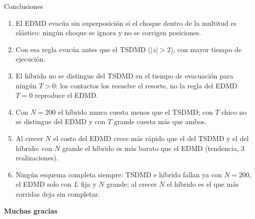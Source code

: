 \begin{frame}{Conclusiones}
  \begin{enumerate}
    \small
    \item El EDMD evacúa sin superposición si el choque dentro de la multitud es elástico: ningún choque se ignora y no se corrigen posiciones.
    \item Con esa regla evacúa antes que el TSDMD ($|z|>2$), con mayor tiempo de ejecución.
    \item El híbrido no se distingue del TSDMD en el tiempo de evacuación para ningún $T>0$: los contactos los resuelve el resorte, no la regla del EDMD. $T = 0$ reproduce el EDMD.
    \item Con $N = 200$ el híbrido nunca cuesta menos que el TSDMD; con $T$ chico no se distingue del EDMD y con $T$ grande cuesta más que ambos.
    \item Al crecer $N$ el costo del EDMD crece más rápido que el del TSDMD y el del híbrido: con $N$ grande el híbrido es más barato que el EDMD (tendencia, 3 realizaciones).
    \item Ningún esquema completa siempre: TSDMD e híbrido fallan ya con $N = 200$, el EDMD solo con $L$ fija y $N$ grande; al crecer $N$ el híbrido es el que más corridas deja sin completar.
  \end{enumerate}
\end{frame}

\begin{frame}[plain]
  \vfill
  \centering
  {\Huge \textbf{Muchas gracias}}
  \vfill
\end{frame}

\appendix

